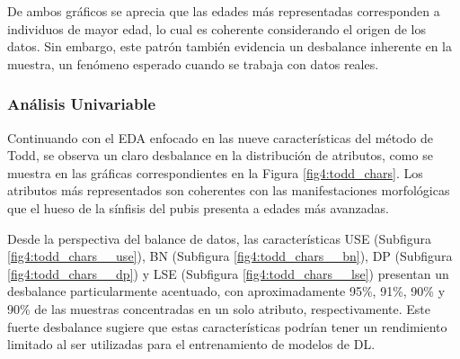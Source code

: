 De ambos gráficos se aprecia que las edades más representadas corresponden a individuos de mayor edad, lo cual es coherente considerando el origen de los datos. Sin embargo, este patrón también evidencia un desbalance inherente en la muestra, un fenómeno esperado cuando se trabaja con datos reales.

\subsubsection{Análisis Univariable}
Continuando con el EDA enfocado en las nueve características del método de Todd, se observa un claro desbalance en la distribución de atributos, como se muestra en las gráficas correspondientes en la Figura \ref{fig4:todd_chars}. Los atributos más representados son coherentes con las manifestaciones morfológicas que el hueso de la sínfisis del pubis presenta a edades más avanzadas.

Desde la perspectiva del balance de datos, las características USE (Subfigura \ref{fig4:todd_chars__use}), BN (Subfigura \ref{fig4:todd_chars__bn}), DP (Subfigura \ref{fig4:todd_chars__dp}) y LSE (Subfigura \ref{fig4:todd_chars__lse}) presentan un desbalance particularmente acentuado, con aproximadamente 95\%, 91\%, 90\% y 90\% de las muestras concentradas en un solo atributo, respectivamente. Este fuerte desbalance sugiere que estas características podrían tener un rendimiento limitado al ser utilizadas para el entrenamiento de modelos de DL.

